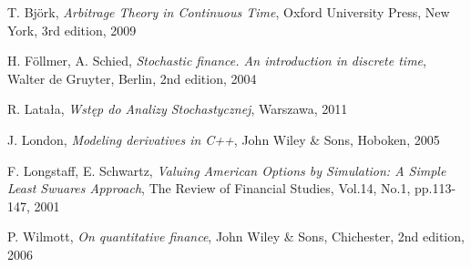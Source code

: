 \documentclass[a4paper,12pt, oneside]{book}
\theoremstyle{definition}
\theoremstyle{remark}
\begin{document}
\begin{thebibliography}{99}

T. Bj\"{o}rk, \emph{Arbitrage Theory in Continuous Time}, Oxford University Press,  New York, 3rd edition, 2009

H. F\"{o}llmer, A. Schied, \emph{Stochastic finance. An introduction in discrete time}, Walter de Gruyter, Berlin, 2nd edition, 2004

R. Latała, \emph{Wstęp do Analizy Stochastycznej}, Warszawa, 2011

J. London, \emph{Modeling derivatives in C++}, John Wiley \& Sons, Hoboken, 2005

F. Longstaff, E. Schwartz, \emph{Valuing American Options by Simulation: A Simple Least Swuares Approach}, The Review of Financial Studies, Vol.14, No.1, pp.113-147, 2001

P. Wilmott, \emph{On quantitative finance}, John Wiley \& Sons, Chichester, 2nd edition, 2006

\end{thebibliography}
\end{document}
